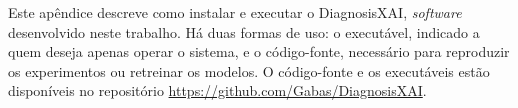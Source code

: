 %
%     
%
%


Este apêndice descreve como instalar e executar o DiagnosisXAI, \textit{software}
desenvolvido neste trabalho. Há duas formas de uso: o executável, indicado a
quem deseja apenas operar o sistema, e o código-fonte, necessário para
reproduzir os experimentos ou retreinar os modelos. O código-fonte e os
executáveis estão disponíveis no repositório
\url{https://github.com/Gabas/DiagnosisXAI}.

